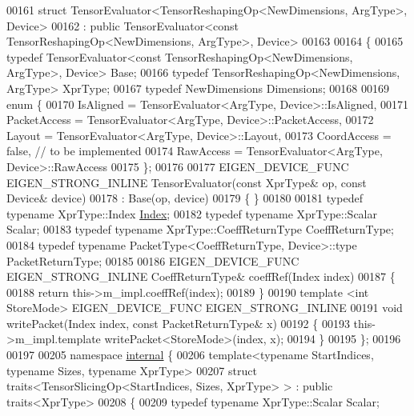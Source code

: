 \begin{DoxyCode}
00161   \textcolor{keyword}{struct }TensorEvaluator<TensorReshapingOp<NewDimensions, ArgType>, Device>
00162   : \textcolor{keyword}{public} TensorEvaluator<const TensorReshapingOp<NewDimensions, ArgType>, Device>
00163 
00164 \{
00165   \textcolor{keyword}{typedef} TensorEvaluator<const TensorReshapingOp<NewDimensions, ArgType>, Device> Base;
00166   \textcolor{keyword}{typedef} TensorReshapingOp<NewDimensions, ArgType> XprType;
00167   \textcolor{keyword}{typedef} NewDimensions Dimensions;
00168 
00169   \textcolor{keyword}{enum} \{
00170     IsAligned = TensorEvaluator<ArgType, Device>::IsAligned,
00171     PacketAccess = TensorEvaluator<ArgType, Device>::PacketAccess,
00172     Layout = TensorEvaluator<ArgType, Device>::Layout,
00173     CoordAccess = \textcolor{keyword}{false},  \textcolor{comment}{// to be implemented}
00174     RawAccess = TensorEvaluator<ArgType, Device>::RawAccess
00175   \};
00176 
00177   EIGEN\_DEVICE\_FUNC EIGEN\_STRONG\_INLINE TensorEvaluator(\textcolor{keyword}{const} XprType& op, \textcolor{keyword}{const} Device& device)
00178     : Base(op, device)
00179   \{ \}
00180 
00181   \textcolor{keyword}{typedef} \textcolor{keyword}{typename} XprType::Index \hyperlink{namespace_eigen_a62e77e0933482dafde8fe197d9a2cfde}{Index};
00182   \textcolor{keyword}{typedef} \textcolor{keyword}{typename} XprType::Scalar Scalar;
00183   \textcolor{keyword}{typedef} \textcolor{keyword}{typename} XprType::CoeffReturnType CoeffReturnType;
00184   \textcolor{keyword}{typedef} \textcolor{keyword}{typename} PacketType<CoeffReturnType, Device>::type PacketReturnType;
00185 
00186   EIGEN\_DEVICE\_FUNC EIGEN\_STRONG\_INLINE CoeffReturnType& coeffRef(Index index)
00187   \{
00188     \textcolor{keywordflow}{return} this->m\_impl.coeffRef(index);
00189   \}
00190   \textcolor{keyword}{template} <\textcolor{keywordtype}{int} StoreMode> EIGEN\_DEVICE\_FUNC EIGEN\_STRONG\_INLINE
00191   \textcolor{keywordtype}{void} writePacket(Index index, \textcolor{keyword}{const} PacketReturnType& x)
00192   \{
00193     this->m\_impl.template writePacket<StoreMode>(index, x);
00194   \}
00195 \};
00196 
00197 
00205 \textcolor{keyword}{namespace }\hyperlink{namespaceinternal}{internal} \{
00206 \textcolor{keyword}{template}<\textcolor{keyword}{typename} StartIndices, \textcolor{keyword}{typename} Sizes, \textcolor{keyword}{typename} XprType>
00207 \textcolor{keyword}{struct }traits<TensorSlicingOp<StartIndices, Sizes, XprType> > : \textcolor{keyword}{public} traits<XprType>
00208 \{
00209   \textcolor{keyword}{typedef} \textcolor{keyword}{typename} XprType::Scalar Scalar;

\end{DoxyCode}
